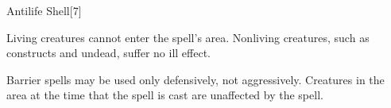 \begin{spellsection}{Antilife Shell}[7]
    \begin{spellheader}
    \end{spellheader}
    \begin{spellcontent}
        \begin{spelltargetinginfo}
        \end{spelltargetinginfo}
        \begin{spelleffects}
            \spelleffect Living creatures cannot enter the spell's area. Nonliving creatures, such as constructs and undead, suffer no ill effect.
            \spelldur \durmed \dismissable
        \end{spelleffects}
    \end{spellcontent}
    \begin{spellfooter}
        \spellnotes Barrier spells may be used only defensively, not aggressively. Creatures in the area at the time that the spell is cast are unaffected by the spell.
        \miscastexplode
    \end{spellfooter}
    \begin{spellaugments}
    \end{spellaugments}
\end{spellsection}

